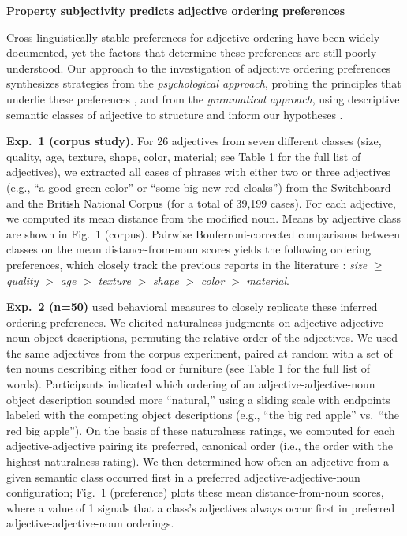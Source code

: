 \documentclass[12pt]{article}
\begin{document}
\begin{center}\textbf{Property subjectivity predicts adjective ordering preferences}
\end{center}
	
	\vspace{-12pt}
	
Cross-linguistically stable preferences for adjective ordering have been widely documented, yet the factors that determine these preferences are still poorly understood. Our approach to the investigation of adjective ordering preferences synthesizes strategies from the \emph{psychological approach}, probing the principles that underlie these preferences \cite{sweet1898,ziff1960,martin1969determinants,martin1969competence,martin1970,kemmereretal2009}, and from the \emph{grammatical approach}, using descriptive semantic classes of adjective to structure and inform our hypotheses \cite{dixon1982,sproatshih1991,cinque1994,scott2002}. 

\textbf{Exp.~1 (corpus study).} For 26 adjectives from seven different classes (size, quality, age, texture, shape, color, material; see Table 1 for the full list of adjectives), we extracted all cases of phrases with either two or three adjectives (e.g., ``a good green color'' or ``some big new red cloaks'') from the Switchboard and the British National Corpus (for a total of 39,199 cases). For each adjective, we  computed its mean distance from the modified noun. Means by adjective class are shown in Fig.~1 (corpus). Pairwise Bonferroni-corrected comparisons between classes on the mean distance-from-noun scores yields the following ordering preferences, which closely track the previous reports in the literature \cite{sproatshih1991,dixon1982}:
\emph{size} $\geq$ \emph{quality} $>$  \emph{age} $>$  \emph{texture} $>$  \emph{shape} $>$  \emph{color} $>$  \emph{material}. %


\textbf{Exp.~2 (n=50)} used behavioral measures to closely replicate these inferred ordering preferences. We elicited naturalness judgments on adjective-adjective-noun object descriptions, permuting the relative order of the adjectives. We used the same adjectives from the corpus experiment, paired at random with a set of ten nouns describing either food or furniture (see Table 1 for the full list of words).
Participants indicated which ordering of an adjective-adjective-noun object description sounded more ``natural,'' using a sliding scale with endpoints labeled with the competing object descriptions (e.g., ``the big red apple'' vs.\ ``the red big apple''). On the basis of these naturalness ratings, we computed for each adjective-adjective pairing its preferred, canonical order (i.e., the order with the highest naturalness rating). We then determined how often an adjective from a given semantic class occurred first in a preferred adjective-adjective-noun configuration; Fig.~1 (preference) plots these mean distance-from-noun scores, where a value of 1 signals that a class's adjectives always occur first in preferred adjective-adjective-noun orderings. 
\end{document}
